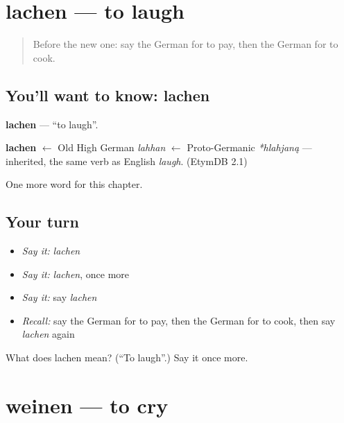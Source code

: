\section[lachen]{lachen — to laugh}

\label{lesson:GE-C65-lachen}



\begin{quote}
Before the new one: say the German for to pay, then the German for to cook.
\end{quote}

\subsection*{You'll want to know: lachen}
\textbf{lachen} — \textquotedblleft{}to laugh\textquotedblright{}.

\begin{cousinweb}
\textbf{lachen} $\leftarrow$ Old High German \emph{lahhan} $\leftarrow$ Proto-Germanic \emph{*hlahjaną} — inherited, the same verb as English \emph{laugh}. (EtymDB 2.1)
\end{cousinweb}

\begin{grammarlens}[title={What you've built}]
One more word for this chapter.
\end{grammarlens}

\subsection*{Your turn}
\begin{itemize}
\raggedright
  \item \emph{Say it:} \emph{lachen}
  \item \emph{Say it:} \emph{lachen}, once more
  \item \emph{Say it:} say \emph{lachen}
  \item \emph{Recall:} say the German for to pay, then the German for to cook, then say \emph{lachen} again
\end{itemize}

\begin{tcolorbox}[breakable,colback=teal!4,colframe=teal!35!black,title={Before you move on}]
What does lachen mean? (\textquotedblleft{}To laugh\textquotedblright{}.) Say it once more.
\end{tcolorbox}
\section[weinen]{weinen — to cry}

